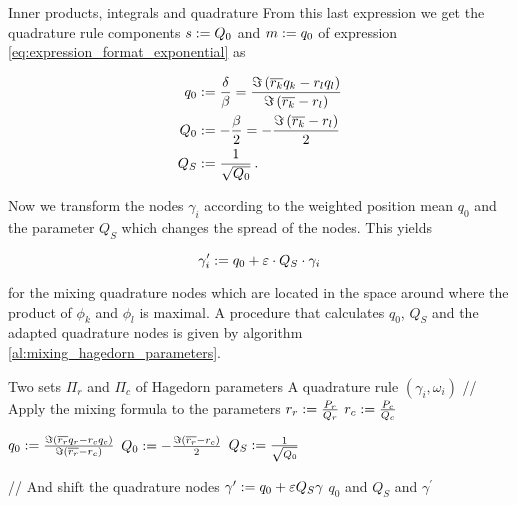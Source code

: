 \begin{chapter}{Inner products, integrals and quadrature}
From this last expression we get the quadrature rule components $s := Q_0$
and $m := q_0$ of expression \eqref{eq:expression_format_exponential} as

\begin{equation} \label{eq:inhomog_quad_params}
\begin{split}
  q_0 & := \frac{\delta}{\beta} = \frac{\Im \left(\overline{r_k}q_k-r_l q_l\right)}{\Im \left(\overline{r_k}-r_l\right)} \\
  Q_0 & := -\frac{\beta}{2} = -\frac{\Im \left(\overline{r_k}-r_l\right)}{2} \\
  Q_S & := \frac{1}{\sqrt{Q_0}} \,.
\end{split}
\end{equation}

Now we transform the nodes $\gamma_i$ according to the weighted position mean $q_0$
and the parameter $Q_S$ which changes the spread of the nodes. This yields

\begin{equation} \label{eq:inhomog_transformed_nodes}
  \gamma^{\prime}_i := q_0 + \varepsilon \cdot Q_S \cdot \gamma_i
\end{equation}

for the mixing quadrature nodes which are located in the space around where
the product of $\phi_k$ and $\phi_l$ is maximal. A procedure that calculates
$q_0$, $Q_S$ and the adapted quadrature nodes is given by algorithm \ref{al:mixing_hagedorn_parameters}.

\begin{algorithm}
\caption{Mixing two sets $\Pi_r$ and $\Pi_c$ of Hagedorn parameters}
\label{al:mixing_hagedorn_parameters}
\begin{algorithmic}
  \REQUIRE Two sets $\Pi_r$ and $\Pi_c$ of Hagedorn parameters
  \REQUIRE A quadrature rule $\left(\gamma_i, \omega_i\right)$
  \STATE // Apply the mixing formula to the parameters
  \STATE $r_r := \frac{P_r}{Q_r}$
  \STATE $r_c := \frac{P_c}{Q_c}$

  \STATE $q_0 := \frac{\Im \left(\overline{r_r}q_r-r_c q_c\right)}{\Im \left(\overline{r_r}-r_c\right)}$
  \STATE $Q_0 := -\frac{\Im \left(\overline{r_r}-r_c\right)}{2}$
  \STATE $Q_S := \frac{1}{\sqrt{Q_0}}$

  \STATE // And shift the quadrature nodes
  \STATE $\gamma^\prime := q_0 + \varepsilon Q_S \gamma$
  \RETURN $q_0$ and $Q_S$ and $\gamma^\prime$
\end{algorithmic}
\end{algorithm}


\end{chapter}
